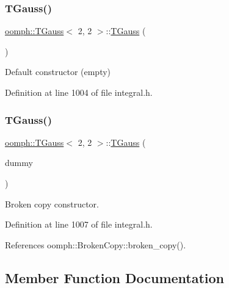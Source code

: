 \subsubsection{\texorpdfstring{T\+Gauss()}{TGauss()}\hspace{0.1cm}{\footnotesize\ttfamily [1/2]}}
{\footnotesize\ttfamily \hyperlink{classoomph_1_1TGauss}{oomph\+::\+T\+Gauss}$<$ 2, 2 $>$\+::\hyperlink{classoomph_1_1TGauss}{T\+Gauss} (\begin{DoxyParamCaption}{ }\end{DoxyParamCaption})\hspace{0.3cm}{\ttfamily [inline]}}



Default constructor (empty) 



Definition at line 1004 of file integral.\+h.

\mbox{\label{classoomph_1_1TGauss_3_012_00_012_01_4_a3687a534a652b5582c5e57aedb8b0542}} 
\subsubsection{\texorpdfstring{T\+Gauss()}{TGauss()}\hspace{0.1cm}{\footnotesize\ttfamily [2/2]}}
{\footnotesize\ttfamily \hyperlink{classoomph_1_1TGauss}{oomph\+::\+T\+Gauss}$<$ 2, 2 $>$\+::\hyperlink{classoomph_1_1TGauss}{T\+Gauss} (\begin{DoxyParamCaption}\item[{const \hyperlink{classoomph_1_1TGauss}{T\+Gauss}$<$ 2, 2 $>$ \&}]{dummy }\end{DoxyParamCaption})\hspace{0.3cm}{\ttfamily [inline]}}



Broken copy constructor. 



Definition at line 1007 of file integral.\+h.



References oomph\+::\+Broken\+Copy\+::broken\+\_\+copy().



\subsection{Member Function Documentation}
\mbox{\label{classoomph_1_1TGauss_3_012_00_012_01_4_a4a0b82daa8e266827e878e69af7056a5}} 
